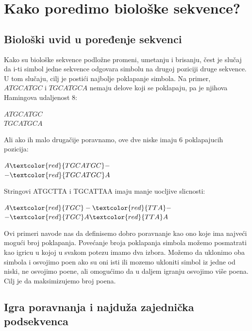 \chapter{Kako poredimo biološke sekvence?}
\setbookcodestyle

\section{Biološki uvid u poređenje sekvenci}

Kako su biološke sekvence podložne promeni, umetanju i brisanju, čest je slučaj da i-ti simbol jedne sekvence odgovara simbolu na drugoj poziciji druge sekvence. U tom slučaju, cilj je postići najbolje poklapanje simbola.
Na primer, $ATGCATGC$ i $TGCATGCA$ nemaju delove koji se poklapaju, pa je njihova Hamingova udaljenost 8:

\begin{center}
$ATGCATGC$\\
$TGCATGCA$
\end{center}
    
Ali ako ih malo drugačije poravnamo, ove dve niske imaju 6 poklapajucih pozicija:

\begin{center}
$A\textcolor{red}{TGCATGC}-$\\
$-\textcolor{red}{TGCATGC}A$
\end{center}

Stringovi ATGCTTA i TGCATTAA imaju manje uocljive slicnosti:

\begin{center}
$A\textcolor{red}{TGC}-\textcolor{red}{TTA}-$\\
$-\textcolor{red}{TGC}A\textcolor{red}{TTA}A$
\end{center}

Ovi primeri navode nas da definisemo dobro poravnanje kao ono koje ima najveći mogući broj poklapanja. Povećanje broja poklapanja simbola možemo posmatrati kao igricu u kojoj u svakom potezu imamo dva izbora. Možemo da uklonimo oba simbola i osvojimo poen ako su oni isti ili mozemo ukloniti simbol iz jedne od niski, ne osvojimo poene, ali omogućimo da u daljem igranju osvojimo više poena. Cilj je da maksimizujemo broj poena.


\section{Igra poravnanja i najduža zajednička podsekvenca}

